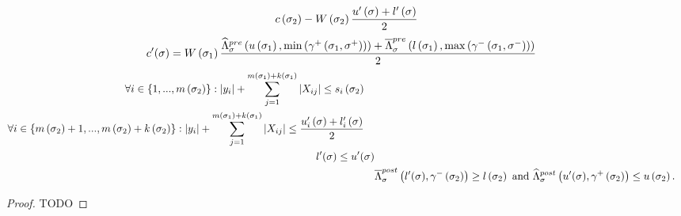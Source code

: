 \begin{lemma}
\begin{align}
\begin{split}
c\left(\sigma_{2}\right) - W\left(\sigma_{2}\right)\frac{u^\prime\left(\sigma\right)+l^\prime\left(\sigma\right)}{2}\\
\end{split}
\end{align}
\begin{align}
\begin{split}
& c^\prime(\sigma) = W\left(\sigma_{1}\right)\frac{\widehat{\Lambda}_{\sigma}^{pre}\left(u\left(\sigma_{1}\right),\min\left(\gamma^+\left(\sigma_{1},\sigma^+\right)\right)\right)+
\overline{\Lambda}_{\sigma}^{pre}\left(l\left(\sigma_{1}\right),\max\left(\gamma^-\left(\sigma_{1},\sigma^-\right)\right)\right)}{2}
\end{split}
\end{align}
\begin{align}
\begin{split}
& \forall i\in \{1,...,m\left(\sigma_{2}\right)\}:
 \left|y_i\right|+\sum_{j=1}^{m\left(\sigma_{1}\right)+k\left(\sigma_{1}\right)}\left|X_{ij}\right|\leq s_i\left(\sigma_{2}\right)
\end{split}\\
\begin{split}
& \forall i\in
\left\{m\left(\sigma_{2}\right)+1,...,m\left(\sigma_{2}\right)+k\left(\sigma_{2}\right)\right\}:
\left|y_i\right|+\sum_{j=1}^{m\left(\sigma_{1}\right)+k\left(\sigma_{1}\right)}\left|X_{ij}\right|\leq \frac{u^\prime_i\left(\sigma\right)+l^\prime_i\left(\sigma\right)}{2}
\end{split}\\
\begin{split}
l^\prime(\sigma)\leq u^\prime(\sigma)
\end{split}\\
& \overline{\Lambda}_{\sigma}^{post}\left(l^\prime(\sigma),\gamma^-\left(\sigma_{2}\right)\right)\geq
l\left(\sigma_{2}\right)~\text{and}~\widehat{\Lambda}_{\sigma}^{post}\left(u^\prime(\sigma),\gamma^+\left(\sigma_{2}\right)\right)\leq u\left(\sigma_{2}\right).
\end{align}
\end{lemma}
\begin{proof}
{\color{red} TODO}
\end{proof}


